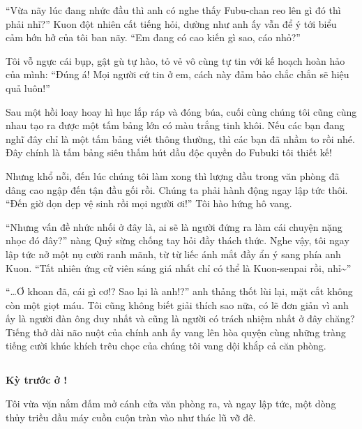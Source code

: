 \documentclass[../main.tex]{subfiles}
\begin{document}
``Vừa nãy lúc đang nhức đầu thì anh có nghe thấy Fubu-chan reo lên gì đó thì phải nhỉ?'' Kuon đột nhiên cất tiếng hỏi, dường như anh ấy vẫn để ý tới biểu cảm hớn hở của tôi ban nãy. ``Em đang có cao kiến gì sao, cáo nhỏ?''

Tôi vỗ ngực cái bụp, gật gù tự hào, tỏ vẻ vô cùng tự tin với kế hoạch hoàn hảo của mình: ``Đúng á! Mọi người cứ tin ở em, cách này đảm bảo chắc chắn sẽ hiệu quả luôn!''

\ct

Sau một hồi loay hoay hì hục lắp ráp và đóng búa, cuối cùng chúng tôi cũng cùng nhau tạo ra được một tấm bảng lớn có màu trắng tinh khôi. Nếu các bạn đang nghĩ đây chỉ là một tấm bảng viết thông thường, thì các bạn đã nhầm to rồi nhé. Đây chính là tấm bảng siêu thấm hút dầu độc quyền do Fubuki tôi thiết kế!


Nhưng khổ nỗi, đến lúc chúng tôi làm xong thì lượng dầu trong văn phòng đã dâng cao ngập đến tận đầu gối rồi. Chúng ta phải hành động ngay lập tức thôi. ``Đến giờ dọn dẹp vệ sinh rồi mọi người ơi!'' Tôi hào hứng hô vang.

``Nhưng vấn đề nhức nhối ở đây là, ai sẽ là người đứng ra làm cái chuyện nặng nhọc đó đây?'' nàng Quỷ sừng chống tay hỏi đầy thách thức. Nghe vậy, tôi ngay lập tức nở một nụ cười ranh mãnh, từ từ liếc ánh mắt đầy ẩn ý sang phía anh Kuon. ``Tất nhiên ứng cử viên sáng giá nhất chỉ có thể là Kuon-senpai rồi, nhỉ\~{}''

``\dots Ơ khoan đã, cái gì cơ!? Sao lại là anh!?'' anh thảng thốt lùi lại, mặt cắt không còn một giọt máu. Tôi cũng không biết giải thích sao nữa, có lẽ đơn giản vì anh ấy là người đàn ông duy nhất và cũng là người có trách nhiệm nhất ở đây chăng? Tiếng thở dài não nuột của chính anh ấy vang lên hòa quyện cùng những tràng tiếng cười khúc khích trêu chọc của chúng tôi vang dội khắp cả căn phòng.

\subsection*{\label{ep-003.V}}

\begin{center}
  \textbf{Kỳ trước ở \hll !}
\end{center}


Tôi vừa vặn nắm đấm mở cánh cửa văn phòng ra, và ngay lập tức, một dòng thủy triều dầu máy cuồn cuộn tràn vào như thác lũ vỡ đê.
\end{document}
